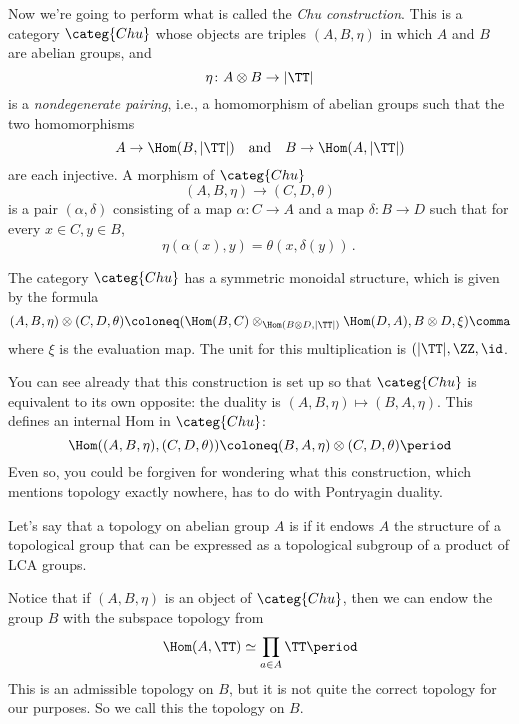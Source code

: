 \documentclass[leqno]{article}
\begin{document}
Now we're going to perform what is called the \emph{Chu construction}.
This is a category \(\categ{Chu}\) whose objects are
triples \((A,B,\eta)\) in which \(A\) and \(B\) are abelian groups, and
\begin{equation*}
    \eta \colon A \otimes B \to |\TT|
\end{equation*}
is a \emph{nondegenerate pairing}, i.e.,
a homomorphism of abelian groups such that the two homomorphisms
\begin{equation*}
    A \to \Hom(B, |\TT|) \quad \text{and} \quad B \to \Hom(A, |\TT|)
\end{equation*}
are each injective.
A morphism of \(\categ{Chu}\)
\begin{equation*}
    (A, B, \eta) \to (C, D, \theta)
\end{equation*}
is a pair \((\alpha,\delta)\)
consisting of a map \(\alpha \colon C \to A\)
and a map \(\delta \colon B \to D\) such that
for every \(x\in C, y \in B\),
\begin{equation*}
    \eta(\alpha(x),y) = \theta(x,\delta(y)) \period
\end{equation*}

The category \(\categ{Chu}\) has a symmetric monoidal structure,
which is given by the formula
\begin{equation*}
    (A, B, \eta) \otimes (C, D, \theta) \coloneq (\Hom(B,C) \otimes_{\Hom(B \otimes D, |\TT|)} \Hom(D, A), B \otimes D, \xi) \comma
\end{equation*}
where \(\xi\) is the evaluation map.
The unit for this multiplication is \((|\TT|,\ZZ,\id\).

You can see already that this construction is set up so that
\(\categ{Chu}\) is equivalent to its own opposite:
the duality is \((A,B,\eta) \mapsto (B,A,\eta)\).
This defines an internal Hom in \(\categ{Chu}\):
\begin{equation*}
    \Hom((A,B,\eta),(C,D,\theta)) \coloneq (B,A,\eta) \otimes (C,D,\theta) \period
\end{equation*}
Even so, you could be forgiven for wondering what this construction,
which mentions topology exactly nowhere, has to do with Pontryagin duality.

Let's say that a topology on abelian group \(A\) is 
if it endows \(A\) the structure of a topological group that
can be expressed as a topological subgroup
of a product of LCA groups.

Notice that if \((A,B,\eta)\) is an object of \(\categ{Chu}\), then
we can endow the group \(B\) with the subspace topology from
\begin{equation*}
    \Hom(A,\TT) \simeq \prod_{a \in A} \TT \period
\end{equation*}
This is an admissible topology on \(B\), but
it is not quite the correct topology for our purposes.
So we call this the  topology on \(B\).
\end{document}
